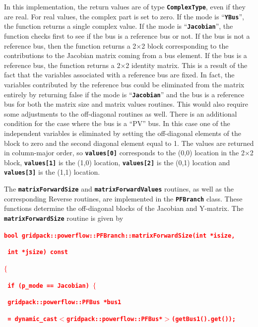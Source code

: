 \documentclass[12pt]{report} %
\begin{document}
In this implementation, the return values are of type \texttt{\textbf{ComplexType}}, even if they are real. For real values, the complex part is set to zero. If the mode is ``\texttt{\textbf{YBus}}'', the function returns a single complex value. If the mode is ``\texttt{\textbf{Jacobian}}'', the function checks first to see if the bus is a reference bus or not. If the bus is not a reference bus, then the function returns a 2$\mathrm{\times}$2 block corresponding to the contributions to the Jacobian matrix coming from a bus element. If the bus is a reference bus, the function returns a 2$\mathrm{\times}$2 identity matrix. This is a result of the fact that the variables associated with a reference bus are fixed. In fact, the variables contributed by the reference bus could be eliminated from the matrix entirely by returning false if the mode is ``\texttt{\textbf{Jacobian}}'' and the bus is a reference bus for both the matrix size and matrix values routines. This would also require some adjustments to the off-diagonal routines as well. There is an additional condition for the case where the bus is a ``PV'' bus. In this case one of the independent variables is eliminated by setting the off-diagonal elements of the block to zero and the second diagonal element equal to 1. The values are returned in column-major order, so \texttt{\textbf{values[0]}} corresponds to the (0,0) location in the 2$\mathrm{\times}$2 block, \texttt{\textbf{values[1]}} is the (1,0) location, \texttt{\textbf{values[2]}} is the (0,1) location and \texttt{\textbf{values[3]}} is the (1,1) location.

The \texttt{\textbf{matrixForwardSize}} and \texttt{\textbf{matrixForwardValues}} routines, as well as the corresponding Reverse routines, are implemented in the \texttt{\textbf{PFBranch}} class. These functions determine the off-diagonal blocks of the Jacobian and Y-matrix. The \texttt{\textbf{matrixForwardSize}} routine is given by

\textcolor{red}{\texttt{\textbf{bool gridpack::powerflow::PFBranch::matrixForwardSize(int *isize,}}}

\textcolor{red}{\texttt{\textbf{     int *jsize) const}}}

\textcolor{red}{\texttt{\textbf{$\boldsymbol{\mathrm{\{}}$}}}

\textcolor{red}{\texttt{\textbf{  if (p\_mode == Jacobian) $\boldsymbol{\mathrm{\{}}$}}}

\textcolor{red}{\texttt{\textbf{    gridpack::powerflow::PFBus *bus1}}}

\textcolor{red}{\texttt{\textbf{      = dynamic\_cast$\boldsymbol{\mathrm{<}}$gridpack::powerflow::PFBus*$\boldsymbol{\mathrm{>}}$(getBus1().get());}}}
\end{document}
